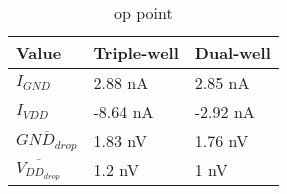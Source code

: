 
\begin{table}[H]
	\centering
	\begin{tabularx}{\columnwidth}{XXX}
		Value  & Triple-well & Dual-well \\ \hline
		$I_{GND}$                                & 2.88 nA       & 2.85 nA      \\
		$I_{VDD}$                                & -8.64 nA      & -2.92 nA       \\
		$\overline{GND_{drop}}$      & 1.83 nV       & 1.76 nV      \\
		$\overline{V_{DD_{drop}}}$  & 1.2 nV         & 1 nV
	\end{tabularx}
	\caption{op point}
	\label{tab_op}
\end{table}
